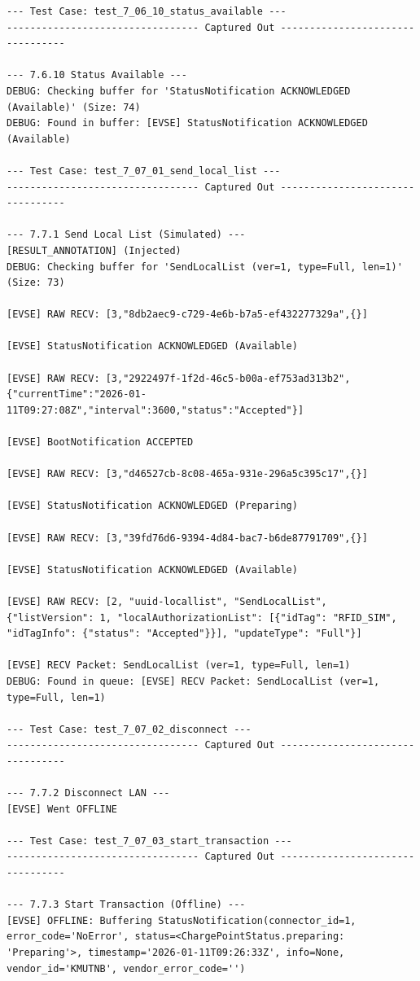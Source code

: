 \documentclass{article}
\begin{document}
\begin{lstlisting}
--- Test Case: test_7_06_10_status_available ---
--------------------------------- Captured Out ---------------------------------

--- 7.6.10 Status Available ---
DEBUG: Checking buffer for 'StatusNotification ACKNOWLEDGED (Available)' (Size: 74)
DEBUG: Found in buffer: [EVSE] StatusNotification ACKNOWLEDGED (Available)

--- Test Case: test_7_07_01_send_local_list ---
--------------------------------- Captured Out ---------------------------------

--- 7.7.1 Send Local List (Simulated) ---
[RESULT_ANNOTATION] (Injected)
DEBUG: Checking buffer for 'SendLocalList (ver=1, type=Full, len=1)' (Size: 73)

[EVSE] RAW RECV: [3,"8db2aec9-c729-4e6b-b7a5-ef432277329a",{}]

[EVSE] StatusNotification ACKNOWLEDGED (Available)

[EVSE] RAW RECV: [3,"2922497f-1f2d-46c5-b00a-ef753ad313b2",{"currentTime":"2026-01-11T09:27:08Z","interval":3600,"status":"Accepted"}]

[EVSE] BootNotification ACCEPTED

[EVSE] RAW RECV: [3,"d46527cb-8c08-465a-931e-296a5c395c17",{}]

[EVSE] StatusNotification ACKNOWLEDGED (Preparing)

[EVSE] RAW RECV: [3,"39fd76d6-9394-4d84-bac7-b6de87791709",{}]

[EVSE] StatusNotification ACKNOWLEDGED (Available)

[EVSE] RAW RECV: [2, "uuid-locallist", "SendLocalList", {"listVersion": 1, "localAuthorizationList": [{"idTag": "RFID_SIM", "idTagInfo": {"status": "Accepted"}}], "updateType": "Full"}]

[EVSE] RECV Packet: SendLocalList (ver=1, type=Full, len=1)
DEBUG: Found in queue: [EVSE] RECV Packet: SendLocalList (ver=1, type=Full, len=1)

--- Test Case: test_7_07_02_disconnect ---
--------------------------------- Captured Out ---------------------------------

--- 7.7.2 Disconnect LAN ---
[EVSE] Went OFFLINE

--- Test Case: test_7_07_03_start_transaction ---
--------------------------------- Captured Out ---------------------------------

--- 7.7.3 Start Transaction (Offline) ---
[EVSE] OFFLINE: Buffering StatusNotification(connector_id=1, error_code='NoError', status=<ChargePointStatus.preparing: 'Preparing'>, timestamp='2026-01-11T09:26:33Z', info=None, vendor_id='KMUTNB', vendor_error_code='')


\end{lstlisting}
\end{document}
